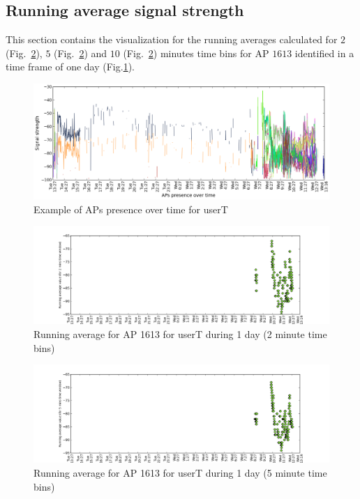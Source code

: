\subsection{Running average signal strength}
\label{appendix_rn_avg}

This section contains the visualization for the running averages calculated for
$2$ (Fig.~\ref{user_1_AP1613_rn2avg_1d}), $5$
(Fig.~\ref{user_1_AP1613_rn2avg_1d}) and $10$
(Fig.~\ref{user_1_AP1613_rn2avg_1d}) minutes time bins for AP $1613$ identified
in a time frame of one day (Fig.\ref{user_1_APs_1d_ap}).

\begin{figure}[!h]
\centering
\includegraphics[width
=\textwidth]{figures/rn_avg/user_1_sorted_1days_plot.png}
\caption{Example of APs presence over time for userT}
\label{user_1_APs_1d_ap}
\end{figure}

\begin{figure}[!h]
\centering
\includegraphics[width
=\textwidth]{figures/rn_avg/user_1_sorted_1days_plot_1613_rn_avg_sig_2.png}
\caption{Running average for AP 1613 for userT during 1 day (2 minute time
bins)}
\label{user_1_AP1613_rn2avg_1d}
\end{figure}

\begin{figure}[!h]
\centering
\includegraphics[width
=\textwidth]{figures/rn_avg/user_1_sorted_1days_plot_1613_rn_avg_sig_5.png}
\caption{Running average for AP 1613 for userT during 1 day (5 minute time
bins)}
\label{user_1_AP1613_rn5avg_1d}
\end{figure}

